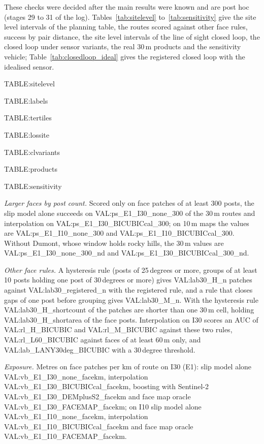 These checks were decided after the main results were known and are post hoc (stages 29 to 31 of the log). Tables~\ref{tab:sitelevel} to~\ref{tab:sensitivity} give the site level intervals of the planning table, the routes scored against other face rules, success by pair distance, the site level intervals of the line of sight closed loop, the closed loop under sensor variants, the real 30\,m products and the sensitivity vehicle; Table~\ref{tab:closedloop_ideal} gives the registered closed loop with the idealised sensor.

{{TABLE:sitelevel}}

{{TABLE:labels}}

{{TABLE:tertiles}}

{{TABLE:lossite}}

{{TABLE:clvariants}}

{{TABLE:products}}

{{TABLE:sensitivity}}

\textit{Larger faces by post count.} Scored only on face patches of at least 300 posts, the slip model alone succeeds on {{VAL:ps_E1_I30_none_300}} of the 30\,m routes and interpolation on {{VAL:ps_E1_I30_BICUBICcal_300}}; on 10\,m maps the values are {{VAL:ps_E1_I10_none_300}} and {{VAL:ps_E1_I10_BICUBICcal_300}}. Without Dumont, whose window holds rocky hills, the 30\,m values are {{VAL:ps_E1_I30_none_300_nd}} and {{VAL:ps_E1_I30_BICUBICcal_300_nd}}.

\textit{Other face rules.} A hysteresis rule (posts of 25\,degrees or more, groups of at least 10 posts holding one post of 30\,degrees or more) gives {{VAL:lab30_H_n}} patches against {{VAL:lab30_registered_n}} with the registered rule, and a rule that closes gaps of one post before grouping gives {{VAL:lab30_M_n}}. With the hysteresis rule {{VAL:lab30_H_shortcount}} of the patches are shorter than one 30\,m cell, holding {{VAL:lab30_H_shortarea}} of the face posts. Interpolation on I30 scores an AUC of {{VAL:rl_H_BICUBIC}} and {{VAL:rl_M_BICUBIC}} against these two rules, {{VAL:rl_L60_BICUBIC}} against faces of at least 60\,m only, and {{VAL:lab_LANY30deg_BICUBIC}} with a 30\,degree threshold.

\textit{Exposure.} Metres on face patches per km of route on I30 (E1): slip model alone {{VAL:vb_E1_I30_none_facekm}}, interpolation {{VAL:vb_E1_I30_BICUBICcal_facekm}}, boosting with Sentinel-2 {{VAL:vb_E1_I30_DEMplusS2_facekm}} and face map oracle {{VAL:vb_E1_I30_FACEMAP_facekm}}; on I10 slip model alone {{VAL:vb_E1_I10_none_facekm}}, interpolation {{VAL:vb_E1_I10_BICUBICcal_facekm}} and face map oracle {{VAL:vb_E1_I10_FACEMAP_facekm}}.

